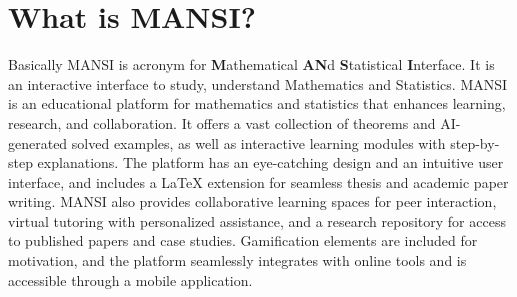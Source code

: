 \documentclass[20pt]{report}
\begin{document}
\chapter{What is MANSI?}
Basically MANSI is acronym for \textbf{M}athematical \textbf{AN}d \textbf{S}tatistical \textbf{I}nterface. 
It is an interactive interface to study, understand Mathematics and Statistics.
MANSI is an educational platform for mathematics and statistics that enhances learning, research, and collaboration.
It offers a vast collection of theorems and AI-generated solved examples, as well as interactive learning modules with step-by-step explanations.
The platform has an eye-catching design and an intuitive user interface, and includes a LaTeX extension for seamless thesis and academic paper writing.
MANSI also provides collaborative learning spaces for peer interaction, virtual tutoring with personalized assistance, and a research repository for access to published papers and case studies.
Gamification elements are included for motivation, and the platform seamlessly integrates with online tools and is accessible through a mobile application.
\end{document}
